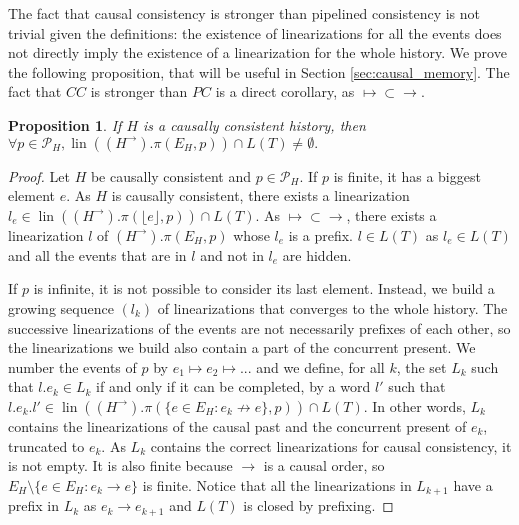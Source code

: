 \documentclass[9pt,numbers]{sigplanconf}
\newtheorem{proposition}{Proposition}
\DeclareMathOperator{\lin}{lin}
\begin{document}
The fact that causal consistency is stronger than pipelined consistency is not trivial
given the definitions: the existence of linearizations for all the events does not directly
imply the existence of a linearization for the whole history. We prove the following
proposition, that will be useful in Section \ref{sec:causal_memory}. The fact that $CC$ is
stronger than $PC$ is a direct corollary, as ${\mapsto} \subset {\rightarrow}$.

\begin{proposition}\label{lem:CC_to_PC}
  If $H$ is a causally consistent history, then \linebreak 
  $\forall p\in \mathscr{P}_H, \lin\left((H^{\rightarrow}).\pi(E_H, p)\right)\cap L(T) \neq \emptyset.$
\end{proposition}
\begin{proof}
  Let $H$ be causally consistent and $p\in \mathscr{P}_H$. 
  If $p$ is finite, it has a biggest element $e$. As $H$ is causally consistent,
  there exists a linearization  $l_e \in \lin((H^\rightarrow).\pi(\lfloor e\rfloor, p))\cap L(T)$.
  As $\mapsto \subset \rightarrow$, there exists a linearization $l$ of $(H^{\rightarrow}).\pi(E_H, p)$ whose $l_e$ is a prefix. 
  $l\in L(T)$ as $l_e\in L(T)$ and all the events that are in $l$ and not in $l_e$ are hidden.

  If $p$ is infinite, it is not possible to consider its last element. Instead, we build a growing sequence $(l_k)$
  of linearizations that converges to the whole history. The successive linearizations of the events are not
  necessarily prefixes of each other, so the linearizations we build also contain 
  a part of the concurrent present. We number the events of $p$ by $e_1\mapsto e_2 \mapsto ...$ and we define, 
  for all $k$, the set $L_k$ such that $l.e_k\in L_k$ if and only if it can be completed, by a word $l'$ such that \linebreak
  $l.e_k.l'\in \lin((H^\rightarrow).\pi(\{e\in E_H : e_k \not\rightarrow e\}, p))\cap L(T)$. In other words, 
  $L_k$ contains the linearizations of the causal past and the concurrent present of $e_k$, truncated to $e_k$.
  As $L_k$ contains the correct linearizations for causal consistency, it is not empty. It is also finite because
  $\rightarrow$ is a causal order, so $E_H\setminus \{e\in E_H : e_k \rightarrow e\}$ is finite. 
  Notice that all the linearizations in $L_{k+1}$ have a prefix in $L_k$ as $e_k\rightarrow e_{k+1}$ and $L(T)$ 
  is closed by prefixing.


\end{proof}
\end{document}
